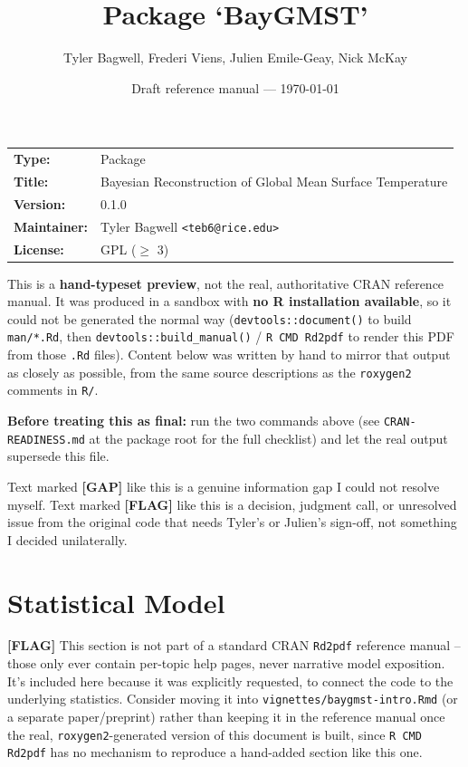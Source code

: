 \documentclass[10pt]{article}
\title{Package `BayGMST'}
\date{Draft reference manual --- \today}
\author{Tyler Bagwell, Frederi Viens, Julien Emile-Geay, Nick McKay}
\newcommand{\gap}[1]{\textcolor{gapred}{\textbf{[GAP]} #1}}
\newcommand{\flag}[1]{\textcolor{gaporange}{\textbf{[FLAG]} #1}}
\begin{document}
\maketitle
\thispagestyle{empty}

\begin{center}
\begin{tabular}{ll}
\textbf{Type:} & Package \\
\textbf{Title:} & Bayesian Reconstruction of Global Mean Surface Temperature \\
\textbf{Version:} & 0.1.0 \\
\textbf{Maintainer:} & Tyler Bagwell \texttt{<teb6@rice.edu>} \\
\textbf{License:} & GPL ($\geq$ 3) \\
\end{tabular}
\end{center}

\vspace{1em}
\begin{gapbanner}
This is a \textbf{hand-typeset preview}, not the real, authoritative CRAN
reference manual. It was produced in a sandbox with \textbf{no R
installation available}, so it could not be generated the normal way
(\texttt{devtools::document()} to build \texttt{man/*.Rd}, then
\texttt{devtools::build\_manual()} / \texttt{R CMD Rd2pdf} to render this
PDF from those \texttt{.Rd} files). Content below was written by hand to
mirror that output as closely as possible, from the same source
descriptions as the \texttt{roxygen2} comments in \texttt{R/}.

\textbf{Before treating this as final:} run the two commands above (see
\texttt{CRAN-READINESS.md} at the package root for the full checklist) and
let the real output supersede this file.

Text marked \gap{like this} is a genuine information gap I could not
resolve myself. Text marked \flag{like this} is a decision, judgment call,
or unresolved issue from the original code that needs Tyler's or Julien's
sign-off, not something I decided unilaterally.
\end{gapbanner}

\clearpage
\tableofcontents

\clearpage
\section{Statistical Model}
\label{sec:model}

\flag{This section is not part of a standard CRAN \texttt{Rd2pdf} reference
manual -- those only ever contain per-topic help pages, never narrative
model exposition. It's included here because it was explicitly requested,
to connect the code to the underlying statistics. Consider moving it into
\texttt{vignettes/baygmst-intro.Rmd} (or a separate paper/preprint) rather
than keeping it in the reference manual once the real, \texttt{roxygen2}-generated
version of this document is built, since \texttt{R CMD Rd2pdf} has no
mechanism to reproduce a hand-added section like this one.}
\end{document}
